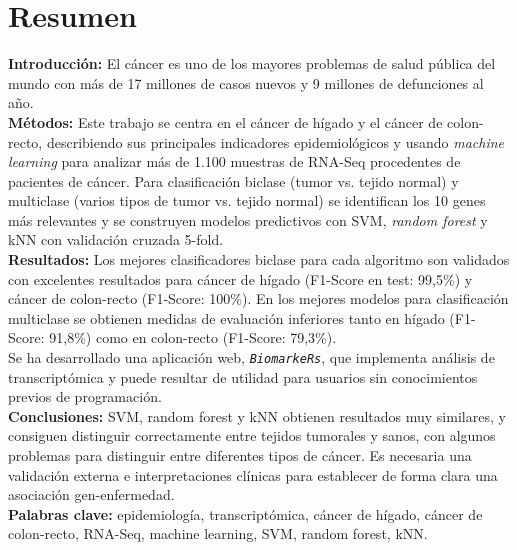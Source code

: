 \thispagestyle{plain}


\vspace{-30pt}

\section*{Resumen}

\textbf{Introducción:} El cáncer es uno de los mayores problemas de salud pública del mundo con más de 17 millones de casos nuevos y 9 millones de defunciones al año. \\

\textbf{Métodos:} Este trabajo se centra en el cáncer de hígado y el cáncer de colon-recto, describiendo sus principales indicadores epidemiológicos y usando \textit{machine learning} para analizar más de 1.100 muestras de RNA-Seq procedentes de pacientes de cáncer. Para clasificación biclase (tumor vs. tejido normal) y multiclase (varios tipos de tumor vs. tejido normal) se identifican los 10 genes más relevantes y se construyen modelos predictivos con SVM, \textit{random forest} y kNN con validación cruzada 5-fold.\\

\textbf{Resultados:} Los mejores clasificadores biclase para cada algoritmo son validados con excelentes resultados para cáncer de hígado (F1-Score en test: 99,5\%) y cáncer de colon-recto (F1-Score: 100\%). En los mejores modelos para clasificación multiclase se obtienen medidas de evaluación inferiores tanto en hígado (F1-Score: 91,8\%) como en colon-recto (F1-Score: 79,3\%).\\

Se ha desarrollado una aplicación web, \texttt{\textit{BiomarkeRs}}, que implementa análisis de transcriptómica y puede resultar de utilidad para usuarios sin conocimientos previos de programación.\\

\textbf{Conclusiones:} SVM, random forest y kNN obtienen resultados muy similares, y consiguen distinguir correctamente entre tejidos tumorales y sanos, con algunos problemas para distinguir entre diferentes tipos de cáncer. Es necesaria una validación externa e interpretaciones clínicas para establecer de forma clara una asociación gen-enfermedad.\\

\textbf{Palabras clave:} epidemiología, transcriptómica, cáncer de hígado, cáncer de colon-recto, RNA-Seq, machine learning, SVM, random forest, kNN.

